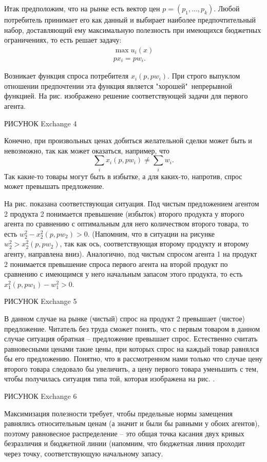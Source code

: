 Итак предположим, что на рынке есть вектор цен $p=(p_1,\ldots,p_k)$. Любой
потребитель принимает его как данный и выбирает наиболее предпочтительный набор,
доставляющий ему максимальную полезность при имеющихся бюджетных ограничениях,
то есть решает задачу:
$$
\begin{array}{c}
\max u_i(x)\\
px_i=pw_i.
\end{array}
$$



Возникает функция спроса потребителя $x_i(p,pw_i)$. При строго
выпуклом отношении предпочтении эта функция является "хорошей"\, непрерывной функцией.
На рис.    изображено решение соответствующей задачи для первого агента.

РИСУНОК  Exchange 4



Конечно, при произвольных ценах добиться желательной сделки может
быть и невозможно, так как может оказаться, например, что
$$
\sum_ix_i(p,pw_i)\ne\sum_iw_i.
$$
Так какие-то товары могут быть в избытке, а для каких-то, напротив,
спрос может превышать предложение.

На рис.     показана соответствующая ситуация. Под чистым предложением
агентом 2 продукта 2 понимается превышение (избыток) второго продукта
у второго агента по сравнению с оптимальным для него количеством
второго товара, то есть $w^2_2-x^2_2(p,pw_2)>0$. (Напомним, что в
ситуации на рисунке $w^2_2>x^2_2(p,pw_2)$, так как ось, соответствующая второму
продукту и второму агенту, направлена вниз). Аналогично, под чистым спросом
агента 1 на продукт 2 понимается превышение спроса первого агента на второй продукт
по сравнению с имеющимся у него начальным запасом этого продукта,
то есть $x^2_1(p,pw_1)-w^2_1>0$.

РИСУНОК  Exchange 5

В данном случае на рынке (чистый) спрос на продукт 2 превышает (чистое) предложение.
Читатель без труда сможет понять, что с первым товаром в данном случае
ситуация обратная -- предложение превышает спрос.
Естественно считать равновесными ценами такие цены, при которых
спрос на каждый товар равнялся бы его предложению. Понятно, что в
рассмотренном нами только что случае цену второго товара следовало бы увеличить,
а цену первого товара уменьшить с тем, чтобы получилась ситуация типа
той, которая изображена на рис.   .

РИСУНОК  Exchange 6

Максимизация полезности требует, чтобы предельные нормы замещения
равнялись относительным ценам (а значит и были бы равными у обоих
агентов), поэтому равновесное распределение -- это общая точка
касания двух кривых безразличия и бюджетной линии (напомним,
что бюджетная линия проходит через точку, соответствующую начальному запасу.

